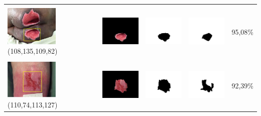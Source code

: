 \begin{table}[H]
\begin{tabular}{|m{1.0in}|m{1.0in}|m{1.0in}|m{1.0in}|m{0.6in}|}
		&  &  & \\
		\includegraphics[width=1.0in]{gambar/hasil_segmentasi/luka_merah/image_36_rect.jpg} {\centering\fontsize{10}{10}\selectfont(108,135,109,82)}&
		\includegraphics[width=1.0in]{gambar/hasil_segmentasi/luka_merah/result_36.jpg}&
		\includegraphics[width=1.0in]{gambar/hasil_segmentasi/luka_merah/mask_r_36.jpg}&
		\includegraphics[width=1.0in]{gambar/hasil_segmentasi/luka_merah/36_r.jpg}&
		95,08\% \\
		\hline

		&  &  & \\
		\includegraphics[width=1.0in]{gambar/hasil_segmentasi/luka_merah/image_38_rect.jpg} {\centering\fontsize{10}{10}\selectfont(110,74,113,127)}&
		\includegraphics[width=1.0in]{gambar/hasil_segmentasi/luka_merah/result_38.jpg}&
		\includegraphics[width=1.0in]{gambar/hasil_segmentasi/luka_merah/mask_r_38.jpg}&
		\includegraphics[width=1.0in]{gambar/hasil_segmentasi/luka_merah/38_r.jpg}&
		92,39\% \\
		\hline
	\end{tabular}
\end{table}